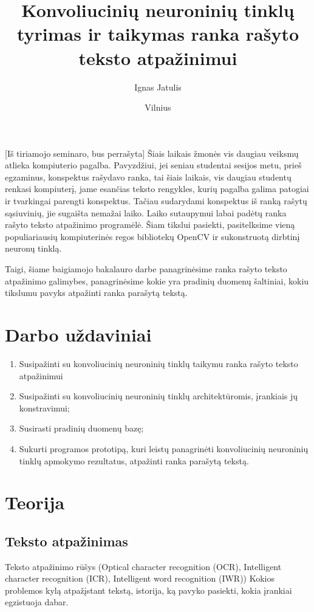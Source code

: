 \documentclass{VUMIFInfBakalaurinis}
\title{Konvoliucinių neuroninių tinklų tyrimas ir taikymas ranka rašyto teksto atpažinimui}
\author{Ignas Jatulis}
\date{Vilnius \\ \the\year}
\begin{document}
\maketitle

\tableofcontents


[Iš tiriamojo seminaro, bus perrašyta]
Šiais laikais žmonės vis daugiau veiksmų atlieka kompiuterio pagalba. Pavyzdžiui, jei seniau studentai sesijos metu, prieš egzaminus, konspektus rašydavo ranka, tai šiais laikais, vis daugiau studentų renkasi kompiuterį, jame esančias teksto rengykles, kurių pagalba galima patogiai ir tvarkingai parengti konspektus. Tačiau sudarydami konspektus iš ranką rašytų sąsiuvinių, jie sugaišta nemažai laiko.  Laiko sutaupymui labai padėtų ranka rašyto teksto atpažinimo programėlė. Šiam tikslui pasiekti, pasitelksime vieną populiariausių kompiuterinės regos bibliotekų OpenCV ir sukonstruotą dirbtinį neuronų tinklą.

Taigi, šiame baigiamojo bakalauro darbe panagrinėsime ranka rašyto teksto atpažinimo galimybes, panagrinėsime kokie yra pradinių duomenų šaltiniai, kokiu tikslumu pavyks atpažinti ranka parašytą tekstą.

\section{Darbo uždaviniai}
\begin{enumerate}
    \item Susipažinti su konvoliucinių neuroninių tinklų taikymu ranka rašyto teksto atpažinimui
    \item Susipažinti su konvoliucinių neuroninių tinklų architektūromis, įrankiais jų konstravimui;
    \item Susirasti pradinių duomenų bazę;
    \item Sukurti programos prototipą, kuri leistų panagrinėti konvoliucinių neuroninių tinklų apmokymo rezultatus, atpažinti ranka parašytą tekstą. 
\end{enumerate}

\section{Teorija}

\subsection{Teksto atpažinimas}
Teksto atpažinimo rūšys (Optical character recognition (OCR), Intelligent character recognition (ICR), Intelligent word recognition (IWR))
Kokios problemos kylą atpažįstant tekstą, istorija, ką pavyko pasiekti, kokia įrankiai egzistuoja dabar.
\end{document}
